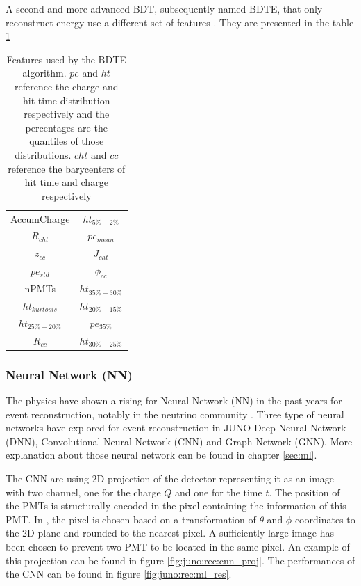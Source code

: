 \documentclass[../main.tex]{subfiles}
\begin{document}
A second and more advanced BDT, subsequently named BDTE, that only reconstruct energy use a different set of features \cite{gavrikov_energy_2022}. They are presented in the table \ref{tab:juno:rec:bdte}

\begin{table}
  \centering
  \begin{tabular}{|c|c|}
    \hline
    AccumCharge &  $ht_{5\%-2\%}$ \\
    $R_{cht}$ & $pe_{mean}$ \\
    $z_{cc}$ & $J_{cht}$ \\
    $pe_{std}$ & $\phi_{cc}$ \\
    nPMTs &  $ht_{35\%-30\%}$\\
    $ht_{kurtosis}$ & $ht_{20\%-15\%}$ \\
    $ht_{25\%-20\%}$ & $pe_{35\%}$ \\
    $R_{cc}$ & $ht_{30\%-25\%}$ \\
    \hline

  \end{tabular}
  \caption{Features used by the BDTE algorithm. $pe$ and $ht$ reference the charge and hit-time distribution respectively and the percentages are the quantiles of those distributions. $cht$ and $cc$ reference the barycenters of hit time and charge respectively}
  \label{tab:juno:rec:bdte}
\end{table}

\subsubsection{Neural Network (NN)}
The physics have shown a rising for Neural Network (NN) in the past years for event reconstruction, notably in the neutrino community \cite{abbasi_graph_2022, reck_graph_2021, collaboration_convolutional_2021, dune_collaboration_neutrino_2020}. Three type of neural networks have explored for event reconstruction in JUNO Deep Neural Network (DNN), Convolutional Neural Network (CNN) and Graph Network (GNN). More explanation about those neural network can be found in chapter \ref{sec:ml}.

The CNN are using 2D projection of the detector representing it as an image with two channel, one for the charge $Q$ and one for the time $t$. The position of the PMTs is structurally encoded in the pixel containing the information of this PMT. In \cite{qian_vertex_2021}, the pixel is chosen based on a transformation of $\theta$ and $\phi$ coordinates to the 2D plane and rounded to the nearest pixel. A sufficiently large image has been chosen to prevent two PMT to be located in the same pixel. An example of this projection can be found in figure \ref{fig:juno:rec:cnn_proj}. The performances of the CNN can be found in figure \ref{fig:juno:rec:ml_res}.
\end{document}
